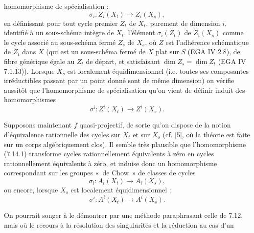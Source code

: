 homomorphisme de spécialisation :
\begin{equation}\tag{7.14.1}
  \sigma_i:Z_i(X_t)\longrightarrow Z_i(X_s),
\end{equation}
en définissant pour tout cycle premier \(Z_t\) de \(X_t\), purement de dimension \(i\), identifié à un sous-schéma intègre de \(X_t\), l'élément \(\sigma_i(Z_t)\) de \(Z_i(X_s)\) comme le cycle associé au sous-schéma fermé \(Z_s\) de \(X_s\), où \(Z\) est l'adhérence schématique de \(Z_t\) dans \(X\) (qui est un sous-schéma fermé de \(X\) plat sur \(S\) (EGA IV 2.8), de fibre générique égale au \(Z_t\) de départ, et satisfaisant \(\dim Z_s=\dim Z_t\) (EGA IV 7.1.13)). Lorsque \(X_s\) est localement équidimensionnel (i.e. toutes ses composantes irréductibles passant par un point donné sont de même dimension) on vérifie aussitôt que l'homomorphisme de spécialisation qu'on vient de définir induit des homomorphismes
\begin{equation}\tag{7.14.1 bis}
  \sigma^i:Z^i(X_t)\longrightarrow Z^i(X_s).
\end{equation}

Supposons maintenant \(f\) quasi-projectif, de sorte qu'on dispose de la notion d'équivalence rationnelle des cycles sur \(X_t\) et sur \(X_s\) (cf. [5], où la théorie est faite sur un corps algébriquement clos). Il semble très plausible que l'homomorphisme (7.14.1) transforme cycles rationnellement équivalents à zéro en cycles rationnellement équivalents à zéro, et induise donc un homomorphisme correspondant sur les groupes «~de Chow~» de classes de cycles
\begin{equation}\tag{7.14.2}
  \sigma_i:A_i(X_t)\longrightarrow A_i(X_s),
\end{equation}
ou encore, lorsque \(X_s\) est localement équidimensionnel :
\begin{equation}\tag{7.14.2 bis}
  \sigma^i:A^i(X_t)\longrightarrow A^i(X_s).
\end{equation}

On pourrait songer à le démontrer par une méthode paraphrasant celle de 7.12, mais où le recours à la résolution des singularités et la réduction au cas d'un
